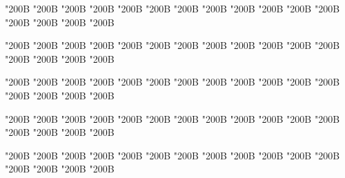 \begin{正文}
\char"200B\relax{}
\char"200B\relax{}
\char"200B\relax{}
\char"200B\relax{}
\char"200B\relax{}
\char"200B\relax{}
\char"200B\relax{}
\char"200B\relax{}
\char"200B\relax{}
\char"200B\relax{}
\char"200B\relax{}
\char"200B\relax{}
\char"200B\relax{}
\char"200B\relax{}
\char"200B\relax{}
\char"200B\relax
{}\par
\end{正文}\clearpage
{}
\begin{正文}
\char"200B\relax{}
\char"200B\relax{}
\char"200B\relax{}
\char"200B\relax{}
\char"200B\relax{}
\char"200B\relax{}
\char"200B\relax{}
\char"200B\relax{}
\char"200B\relax{}
\char"200B\relax{}
\char"200B\relax{}
\char"200B\relax{}
\char"200B\relax{}
\char"200B\relax{}
\char"200B\relax{}
\char"200B\relax
{}\par
\end{正文}\clearpage
{}
\begin{正文}
\char"200B\relax{}
\char"200B\relax{}
\char"200B\relax{}
\char"200B\relax{}
\char"200B\relax{}
\char"200B\relax{}
\char"200B\relax{}
\char"200B\relax{}
\char"200B\relax{}
\char"200B\relax{}
\char"200B\relax{}
\char"200B\relax{}
\char"200B\relax{}
\char"200B\relax{}
\char"200B\relax{}
\char"200B\relax
{}\par
\end{正文}\clearpage
{}
\begin{正文}
\char"200B\relax{}
\char"200B\relax{}
\char"200B\relax{}
\char"200B\relax{}
\char"200B\relax{}
\char"200B\relax{}
\char"200B\relax{}
\char"200B\relax{}
\char"200B\relax{}
\char"200B\relax{}
\char"200B\relax{}
\char"200B\relax{}
\char"200B\relax{}
\char"200B\relax{}
\char"200B\relax{}
\char"200B\relax
{}\par
\end{正文}\clearpage
{}
\begin{正文}
\char"200B\relax{}
\char"200B\relax{}
\char"200B\relax{}
\char"200B\relax{}
\char"200B\relax{}
\char"200B\relax{}
\char"200B\relax{}
\char"200B\relax{}
\char"200B\relax{}
\char"200B\relax{}
\char"200B\relax{}
\char"200B\relax{}
\char"200B\relax{}
\char"200B\relax{}
\char"200B\relax{}
\char"200B\relax
{}\par
\end{正文}\clearpage
